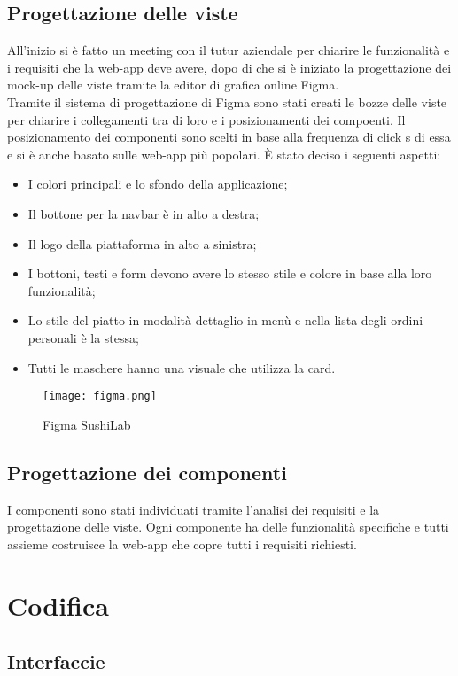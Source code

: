 \subsection{Progettazione delle viste}
All'inizio si è fatto un meeting con il tutur aziendale per chiarire le funzionalità e i requisiti che la web-app deve avere, dopo di che si è iniziato la progettazione dei mock-up delle viste tramite la editor di grafica online Figma.\\
Tramite il sistema di progettazione di Figma sono stati creati le bozze delle viste per chiarire i collegamenti tra di loro e i posizionamenti dei compoenti. 
Il posizionamento dei componenti sono scelti in base alla frequenza di click s di essa e si è anche basato sulle web-app più popolari.
È stato deciso i seguenti aspetti:
\begin{itemize}
    \item I colori principali e lo sfondo della applicazione;
    \item Il bottone per la navbar è in alto a destra;
    \item Il logo della piattaforma in alto a sinistra;
    \item I bottoni, testi e form devono avere lo stesso stile e colore in base alla loro funzionalità;
    \item Lo stile del piatto in modalità dettaglio in menù e nella lista degli ordini personali è la stessa;
    \item Tutti le maschere hanno una visuale che utilizza la card.
\end{itemize}
\begin{figure}[H]
    \centering
    \texttt{[image: figma.png]}
    \caption{Figma SushiLab}
\end{figure}
\subsection{Progettazione dei componenti}
I componenti sono stati individuati tramite l'analisi dei requisiti e la progettazione delle viste. Ogni componente ha delle funzionalità specifiche e tutti assieme costruisce la web-app che copre tutti i requisiti richiesti.
\\
\pagebreak
\section{Codifica}
\subsection{Interfaccie}
